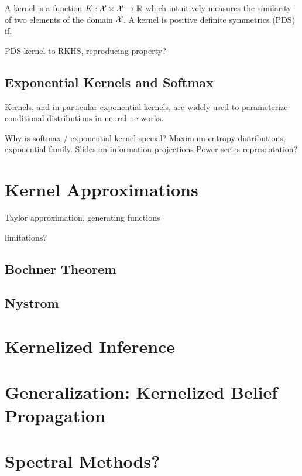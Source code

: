 \documentclass{article}
\begin{document}
A kernel is a function $K: \mathcal{X}\times\mathcal{X}\to\mathbb{R}$ which intuitively measures
the similarity of two elements of the domain $\mathcal{X}$.
A kernel is positive definite symmetrics (PDS) if.

PDS kernel to RKHS, reproducing property?


\subsection{Exponential Kernels and Softmax}
Kernels, and in particular exponential kernels, are widely used to parameterize 
conditional distributions in neural networks.




Why is softmax / exponential kernel special?
Maximum entropy distributions, exponential family.
\href{https://www.lix.polytechnique.fr/~nielsen/CIG-slides.pdf}{Slides on information projections}
Power series representation?

\section{Kernel Approximations}
Taylor approximation, generating functions

limitations?
\subsection{Bochner Theorem}
\subsection{Nystrom}

\section{Kernelized Inference}

\section{Generalization: Kernelized Belief Propagation}

\section{Spectral Methods?}



\end{document}
